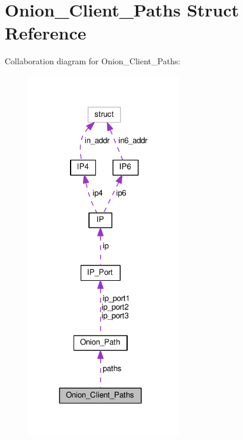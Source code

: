\hypertarget{struct_onion___client___paths}{\section{Onion\+\_\+\+Client\+\_\+\+Paths Struct Reference}
\label{struct_onion___client___paths}
}


Collaboration diagram for Onion\+\_\+\+Client\+\_\+\+Paths\+:\nopagebreak
\begin{figure}[H]
\begin{center}
\leavevmode
\includegraphics[width=192pt]{struct_onion___client___paths__coll__graph}
\end{center}
\end{figure}
